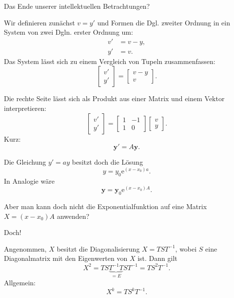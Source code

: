 \documentclass[9pt]{beamer}
\newcommand{\ee}{\mathrm e}
\begin{document}
\begin{frame}
Das Ende unserer intellektuellen Betrachtungen? 
\end{frame}

\begin{frame}
Wir definieren zunächst $v=y'$ und Formen die Dgl. zweiter Ordnung
in ein System von zwei Dgln. erster Ordnung um:
\begin{align*}
v'&=v-y,\\
y'&=v.
\end{align*}
Das System lässt sich zu einem Vergleich von Tupeln zusammenfassen:
\[\begin{bmatrix}
v'\\
y'
\end{bmatrix}
= \begin{bmatrix}
v-y\\
v
\end{bmatrix}.\]
\end{frame}

\begin{frame}
Die rechte Seite lässt sich als Produkt aus einer Matrix und
einem Vektor interpretieren:
\[\begin{bmatrix}
v'\\
y'
\end{bmatrix}
= \begin{bmatrix}
1 & -1\\
1 & 0
\end{bmatrix}
\begin{bmatrix}
v\\
y
\end{bmatrix}.\]
Kurz:
\[\mathbf y' = A\mathbf y.\]
\end{frame}

\begin{frame}
Die Gleichung $y'=ay$ besitzt doch die
Lösung
\[y=y_0\ee^{(x-x_0)a}.\]
In Analogie wäre
\[\mathbf y=\mathbf y_0\ee^{(x-x_0)A}.\]
\end{frame}

\begin{frame}
Aber man kann doch nicht die Exponentialfunktion
auf eine Matrix $X=(x-x_0)A$ anwenden?
\end{frame}

\begin{frame}
Doch!
\end{frame}

\begin{frame}
Angenommen, $X$ besitzt die Diagonalisierung $X=TST^{-1}$, wobei
$S$ eine Diagonalmatrix mit den Eigenwerten von $X$ ist. Dann
gilt
\[X^2 = TS\underbrace{T^{-1}T}_{=E}ST^{-1} = TS^2T^{-1}.\]
Allgemein:
\[X^k = TS^k T^{-1}.\]
\end{frame}
\end{document}
